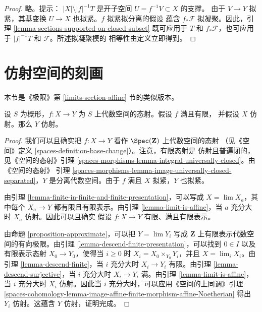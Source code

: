 \begin{proof}
略。提示：%
$|X| \setminus |f|^{-1}T$ 是开子空间 $U = f^{-1}V \subset X$ 的支撑。
由于 $V \to Y$ 拟紧，其基变换 $U \to X$ 也拟紧。$f$ 拟紧拟分离的假设
蕴含 $f_*\mathcal{F}$ 拟凝聚。因此，引理
\ref{lemma-sections-supported-on-closed-subset} 既可应用于 $T$ 和
$f_*\mathcal{F}$，也可应用于 $|f|^{-1}T$ 和 $\mathcal{F}$。所述拟凝聚模的
相等性由定义立即得到。
\end{proof}















\section{仿射空间的刻画}
\label{section-affine}

\noindent
本节是《极限》第 \ref{limits-section-affine} 节的类似版本。

\begin{lemma}
\label{lemma-affine}
设 $S$ 为概形，$f : X \to Y$ 为 $S$ 上代数空间的态射。假设 $f$ 满且有限，
并假设 $X$ 仿射。那么 $Y$ 仿射。
\end{lemma}

\begin{proof}
我们可以且确实把 $f : X \to Y$ 看作 $\Spec(\mathbf{Z})$ 上代数空间的态射
（见《空间》定义 \ref{spaces-definition-base-change}）。注意，有限态射是
仿射且普遍闭的，见《空间的态射》引理
\ref{spaces-morphisms-lemma-integral-universally-closed}。由《空间的态射》
引理 \ref{spaces-morphisms-lemma-image-universally-closed-separated}，$Y$
是分离代数空间。由于 $f$ 满且 $X$ 拟紧，$Y$ 也拟紧。

\medskip\noindent
由引理 \ref{lemma-finite-in-finite-and-finite-presentation}，可以写成
$X = \lim X_a$，其中每个 $X_a \to Y$ 都有限且有限表示。由引理
\ref{lemma-limit-is-affine}，当 $a$ 充分大时 $X_a$ 仿射。因此可以且确实
假设 $f : X \to Y$ 有限、满且有限表示。

\medskip\noindent
由命题 \ref{proposition-approximate}，可以把 $Y = \lim Y_i$ 写成
$\mathbf{Z}$ 上有限表示代数空间的有向极限。由引理
\ref{lemma-descend-finite-presentation}，可以找到 $0 \in I$ 以及有限表示态射
$X_0 \to Y_0$，使得当 $i \geq 0$ 时
$X_i = X_0 \times_{Y_0} Y_i$，并且 $X = \lim_i X_i$。由引理
\ref{lemma-descend-finite}，当 $i$ 充分大时 $X_i \to Y_i$ 有限。由引理
\ref{lemma-descend-surjective}，当 $i$ 充分大时 $X_i \to Y_i$ 满。由引理
\ref{lemma-limit-is-affine}，当 $i$ 充分大时 $X_i$ 仿射。因此当 $i$
充分大时，可以应用《空间的上同调》引理
\ref{spaces-cohomology-lemma-image-affine-finite-morphism-affine-Noetherian}
得出 $Y_i$ 仿射。这蕴含 $Y$ 仿射，证明完成。
\end{proof}

